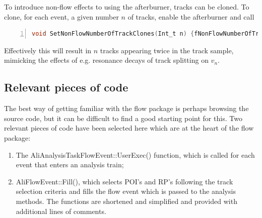 \documentclass[a4paper]{book}
\numberwithin{equation}{subsection}
\begin{document}
To introduce non-flow effects to using the afterburner, tracks can be cloned. To clone, for each event, a given number $n$ of tracks, enable the afterburner and call
\begin{lstlisting}[language=C, numbers=left]
  void SetNonFlowNumberOfTrackClones(Int_t n) {fNonFlowNumberOfTrackClones=n;}\end{lstlisting}
Effectively this will result in $n$ tracks appearing twice in the track sample, mimicking the effects of e.g. resonance decays of track splitting on $v_n$.

\subsection{Relevant pieces of code}
The best way of getting familiar with the flow package is perhaps browsing the source code, but it can be difficult to find a good starting point for this. Two relevant pieces of code have been selected here which are at the heart of the flow package: 
\begin{enumerate}
\item The AliAnalysisTaskFlowEvent::UserExec() function, which is called for each event that enters an analysis train;
\item AliFlowEvent::Fill(), which selects POI's and RP's following the track selection criteria and fills the flow event which is passed to the analysis methods. The functions are shortened and simplified and provided with additional lines of comments.
\end{enumerate}
\end{document}
